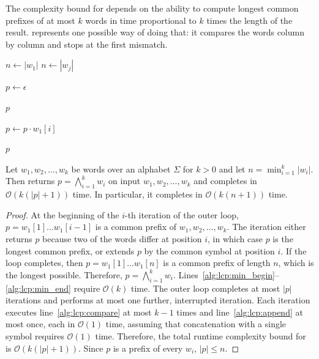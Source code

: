 The complexity bound for  depends on the ability to compute
longest common prefixes of at most $k$ words in time proportional to $k$ times the
length of the result.  represents one possible way of doing that: it
compares the words column by column and stops at the first mismatch.

\begin{algorithm}[h]
  \DontPrintSemicolon

  $n \gets |w_1|$\;
   {
     {
      $n \gets |w_j|$\;
    }
  }

  $p \gets \epsilon$\;
   {
     {
       {
        \Return $p$
      }
    }

    $p \gets p \cdot w_1[i]$\;
  }

  \Return $p$

  \caption{Longest common prefix of $k$ words.}
  \label{alg:lcp}
\end{algorithm}

\begin{proposition}\label{prop:lcp_complexity}
  Let $w_1, w_2, \ldots, w_k$ be words over an alphabet $\Sigma$ for $k > 0$ and let
  $n = \min_{i=1}^k |w_i|$. Then  returns $p = \bigwedge_{i=1}^k w_i$
  on input $w_1, w_2, \ldots, w_k$ and completes in $\mathcal{O}(k(|p| + 1))$ time.
  In particular, it completes in $\mathcal{O}(k(n + 1))$ time.
\end{proposition}

\begin{proof}
  At the beginning of the $i$-th iteration of the outer loop, $p = w_1[1] \ldots
  w_1[i-1]$ is a common prefix of $w_1, w_2, \ldots, w_k$. The iteration either
  returns $p$ because two of the words differ at position $i$, in which case $p$ is
  the longest common prefix, or extends $p$ by the common symbol at position $i$. If
  the loop completes, then $p = w_1[1] \ldots w_1[n]$ is a common prefix of length
  $n$, which is the longest possible. Therefore, $p = \bigwedge_{i=1}^k w_i$.
  Lines~\ref{alg:lcp:min_begin}--\ref{alg:lcp:min_end} require $\mathcal{O}(k)$ time.
  The outer loop completes at most $|p|$ iterations and performs at most one further,
  interrupted iteration. Each iteration executes line~\ref{alg:lcp:compare} at most
  $k - 1$ times and line~\ref{alg:lcp:append} at most once, each in $\mathcal{O}(1)$
  time, assuming that concatenation with a single symbol requires $\mathcal{O}(1)$
  time. Therefore, the total runtime complexity bound for  is
  $\mathcal{O}(k(|p| + 1))$. Since $p$ is a prefix of every $w_i$, $|p| \leq n$.
\end{proof}

